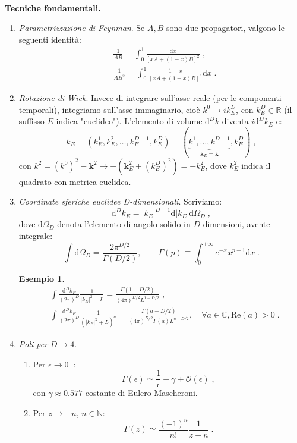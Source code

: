 \documentclass[12pt,a4paper]{article}
\theoremstyle{definition}
\newtheorem{exm}{Esempio}
\newcommand{\diff}[1][]{\mathrm{d}#1}
\numberwithin{equation}{section}
\begin{document}
\\
\textbf{Tecniche fondamentali.}\\
\begin{enumerate}
\item \emph{Parametrizzazione di Feynman}. Se $A,B$ sono due propagatori, valgono le seguenti identità:
\begin{align}
&\frac{1}{AB}=\int_0^1\frac{\diff{x}}{[xA+(1-x)B]^2}\;, \\
&\frac{1}{AB^2}=\int_0^1\frac{1-x}{[xA+(1-x)B]^3}\diff{x}\;.
\end{align}
\item \emph{Rotazione di Wick}. Invece di integrare sull'asse reale (per le componenti temporali), integriamo sull'asse immaginario, cioè  $k^0\to ik_E^D$, con $k_E^D\in\mathbb{R}$ (il suffisso $E$ indica "euclideo"). L'elemento di volume $\diff^D{k}$ diventa $i\diff^D{k}_E$ e:
$$
k_E=(k_E^1,k_E^2,\ldots, k_E^{D-1},k_E^D)=(\underbrace{k^1,\ldots,k^{D-1}}_{\mathbf{k}_E=\mathbf{k}},k_E^D)\;,
$$
con  $k^2=(k^0)^2-\mathbf{k}^2\to -(\mathbf{k}_E^2+(k_E^D)^2)=-k_E^2$, dove $k_E^2$ indica il quadrato con metrica euclidea.
\item \emph{Coordinate sferiche euclidee D-dimensionali}. Scriviamo:
$$
\diff^D{k}_E=|k_E|^{D-1}\diff{|k_E|}\diff{\Omega}_D\;,
$$
dove $\diff{\Omega}_D$ denota l'elemento di angolo solido in $D$ dimensioni, avente integrale:
$$
\int\diff{\Omega}_D=\frac{2\pi^{D/2}}{\Gamma(D/2)},\qquad \Gamma(p)\equiv\int_0^{+\infty}e^{-x}x^{p-1}\diff{x}\;.
$$
\begin{exm}
\begin{align*}
&\int\frac{\diff^D{k_E}}{(2\pi)^D}\frac{1}{|k_E|^2+L}=\frac{\Gamma(1-D/2)}{(4\pi)^{D/2}L^{1-D/2}}\;, \\
&\int\frac{\diff^D{k_E}}{(2\pi)^D}\frac{1}{(|k_E|^2+L)^a}=\frac{\Gamma(a-D/2)}{(4\pi)^{D/2}\Gamma(a)L^{a-D/2}},\quad \forall a\in \mathbb{C}, \mathrm{Re}(a)>0\;.
\end{align*}
\end{exm}
\item \emph{Poli per} $D\to 4$.
\begin{enumerate}
\item Per $\epsilon\to 0^+$:
\begin{equation}
\Gamma(\epsilon)\simeq \frac{1}{\epsilon}-\gamma+\mathcal{O}(\epsilon)\;,
\end{equation}
con $\gamma\approx 0.577$ costante di Eulero-Mascheroni.
\item Per $z\to -n$, $n\in\mathbb{N}$:
\begin{equation}
\Gamma(z)\simeq \frac{(-1)^n}{n!}\frac{1}{z+n}\;.
\end{equation}
\end{enumerate}
\end{enumerate}
\end{document}
